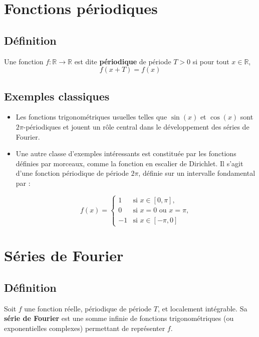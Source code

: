 \documentclass[11pt]{article} %
\begin{document}
\begin{large}
\section{Fonctions périodiques}

\subsection{Définition}

Une fonction \( f : \mathbb{R} \rightarrow \mathbb{R} \) est dite \textbf{périodique} de période \( T > 0 \) si pour tout \( x \in \mathbb{R} \),
\[
f(x + T) = f(x)
\]


\subsection{Exemples classiques}

\begin{itemize}
  \item Les fonctions trigonométriques usuelles telles que \( \sin(x) \) et \( \cos(x) \) sont \( 2\pi \)-périodiques et jouent un rôle central dans le développement des séries de Fourier.

  \item Une autre classe d’exemples intéressants est constituée par les fonctions définies par morceaux, comme la fonction en escalier de Dirichlet. Il s’agit d’une fonction périodique de période \( 2\pi \), définie sur un intervalle fondamental par :

  \[
  f(x) =
  \begin{cases}
  1 & \text{si } x \in [0, \pi], \\
  0 & \text{si } x = 0 \text{ ou } x = \pi, \\
  -1 & \text{si } x \in [-\pi, 0]
  \end{cases}
  \]

  \noindent 
\end{itemize}


\section{Séries de Fourier}

\subsection{Définition}

Soit \( f \) une fonction réelle, périodique de période \( T \), et localement intégrable. Sa \textbf{série de Fourier} est une somme infinie de fonctions trigonométriques (ou exponentielles complexes) permettant de représenter \( f \).


\end{large}
\end{document}
